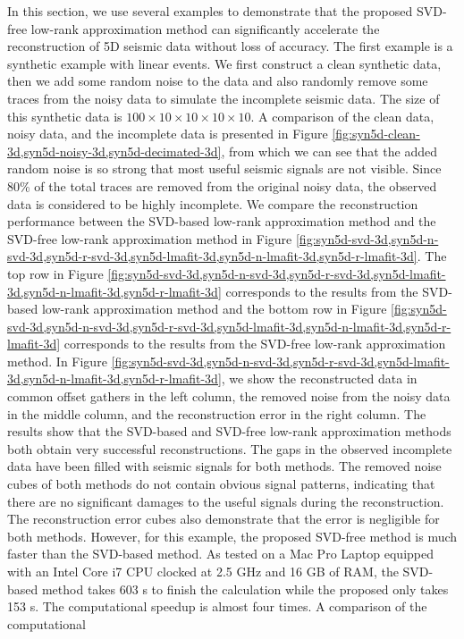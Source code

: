 In this section, we use several  examples to demonstrate that the proposed SVD-free low-rank approximation method can significantly accelerate the reconstruction of 5D seismic data without loss of accuracy.  The first example is a synthetic example with linear events. We first construct a clean synthetic data, then we add some random noise to the data and also randomly remove some traces from the noisy data to simulate the incomplete seismic data. The size of this synthetic data is $100\times10\times10\times10\times10$. A comparison of the clean data, noisy data, and the incomplete data is presented in Figure \ref{fig:syn5d-clean-3d,syn5d-noisy-3d,syn5d-decimated-3d}, from which we can see that the added random noise is so strong that most useful seismic signals are not visible. Since 80\% of the total traces are removed from the original noisy data, the observed data is considered to be highly incomplete. We compare the reconstruction performance between the SVD-based low-rank approximation method and the SVD-free  low-rank approximation method in Figure \ref{fig:syn5d-svd-3d,syn5d-n-svd-3d,syn5d-r-svd-3d,syn5d-lmafit-3d,syn5d-n-lmafit-3d,syn5d-r-lmafit-3d}. The top row in Figure \ref{fig:syn5d-svd-3d,syn5d-n-svd-3d,syn5d-r-svd-3d,syn5d-lmafit-3d,syn5d-n-lmafit-3d,syn5d-r-lmafit-3d} corresponds to the results from the SVD-based low-rank approximation method and the bottom row in Figure \ref{fig:syn5d-svd-3d,syn5d-n-svd-3d,syn5d-r-svd-3d,syn5d-lmafit-3d,syn5d-n-lmafit-3d,syn5d-r-lmafit-3d} corresponds to the results from the SVD-free low-rank approximation method. In  Figure \ref{fig:syn5d-svd-3d,syn5d-n-svd-3d,syn5d-r-svd-3d,syn5d-lmafit-3d,syn5d-n-lmafit-3d,syn5d-r-lmafit-3d}, we show the reconstructed data in common offset gathers in the left column, the removed noise from the noisy data in the middle column, and the reconstruction error in the right column. The results show that the SVD-based and SVD-free low-rank approximation methods both obtain very successful reconstructions. The gaps in the observed incomplete data have been filled with seismic signals for both methods. The removed noise cubes of both methods do not contain obvious signal patterns, indicating that there are no significant damages to the useful signals during the reconstruction. The reconstruction error cubes also demonstrate that the error is negligible for both methods. However, for this example, the proposed SVD-free method is much faster than the SVD-based method. As tested on a Mac Pro Laptop equipped with an Intel Core i7 CPU clocked at 2.5 GHz and 16 GB of RAM, the SVD-based method takes 603 s to finish the calculation while the proposed only takes 153 s. The computational speedup is almost four times. A comparison of the computational 